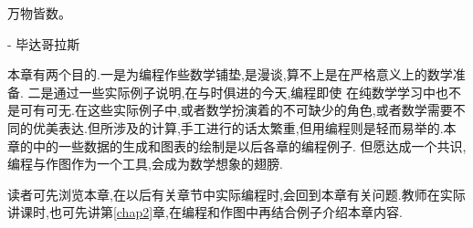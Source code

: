 \documentclass[main.tex]{subfiles}
\begin{document}
\begin{flushright}
	\begin{kaishu}
		万物皆数。\\
	\end{kaishu}
	- 毕达哥拉斯
\end{flushright}

本章有两个目的.一是为编程作些数学铺垫,是漫谈,算不上是在严格意义上的数学准备.
二是通过一些实际例子说明,在与时俱进的今天,编程即使
在纯数学学习中也不是可有可无.在这些实际例子中,或者数学扮演着的不可缺少的角色,或者数学需要不同的优美表达.但所涉及的计算,手工进行的话太繁重,但用编程则是轻而易举的.本章的中的一些数据的生成和图表的绘制是以后各章的编程例子.
但愿达成一个共识,编程与作图作为一个工具,会成为数学想象的翅膀.

读者可先浏览本章,在以后有关章节中实际编程时,会回到本章有关问题.教师在实际讲课时,也可先讲第\ref{chap2}章,在编程和作图中再结合例子介绍本章内容.
\end{document}
